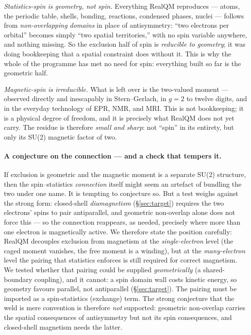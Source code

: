 \documentclass[11pt]{article}
\begin{document}
\emph{Statistics-spin is geometry, not spin.} Everything RealQM reproduces --- atoms, the periodic table,
shells, bonding, reactions, condensed phases, nuclei --- follows from \emph{non-overlapping domains} in
place of antisymmetry: ``two electrons per orbital'' becomes simply ``two spatial territories,'' with no
spin variable anywhere, and nothing missing. So the exclusion half of spin is \emph{reducible to
geometry}; it was doing bookkeeping that a spatial constraint does without it. This is why the whole of
the programme has met no need for spin: everything built so far is the geometric half.

\emph{Magnetic-spin is irreducible.} What is left over is the two-valued moment --- observed directly and
inescapably in Stern--Gerlach, in $g=2$ to twelve digits, and in the everyday technology of EPR, NMR, and
MRI. This is not bookkeeping; it is a physical degree of freedom, and it is precisely what RealQM does not
yet carry. The residue is therefore \emph{small and sharp}: not ``spin'' in its entirety, but only its
SU(2) magnetic factor of two.

\paragraph{A conjecture on the connection --- and a check that tempers it.} If exclusion is geometric and
the magnetic moment is a separate SU(2) structure, then the spin--statistics \emph{connection} itself
might seem an artefact of bundling the two under one name. It is tempting to conjecture so. But a test
weighs against the strong form: closed-shell \emph{diamagnetism} (\S\ref{sec:target}) requires the two
electrons' spins to pair antiparallel, and geometric non-overlap alone does not force this --- so the
connection reappears, as needed, precisely where more than one electron is magnetically active. We
therefore state the position carefully: RealQM decouples exclusion from magnetism at the
\emph{single-electron} level (the caged moment vanishes, the free moment is a winding), but at the
\emph{many-electron} level the pairing that statistics enforces is still required for correct magnetism.
We tested whether that pairing could be supplied \emph{geometrically} (a shared-boundary coupling), and
it cannot: a spin domain wall costs kinetic energy, so geometry favours parallel, not antiparallel
(\S\ref{sec:target}). The pairing must be imported as a spin-statistics (exchange) term. The strong
conjecture that the weld is mere convention is therefore \emph{not} supported: geometric non-overlap
carries the spatial consequences of antisymmetry but not its spin consequences, and closed-shell
magnetism needs the latter.
\end{document}

